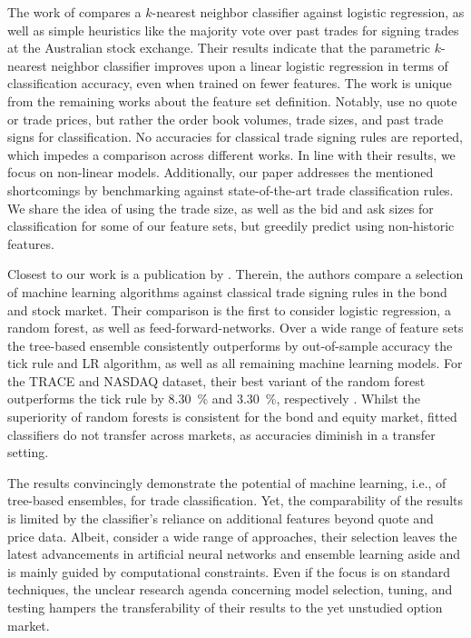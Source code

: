 The work of \textcite[][483]{blazejewskiLocalNonParametricModel2005} compares a $k$-nearest neighbor classifier against logistic regression, as well as simple heuristics like the majority vote over past trades for signing trades at the Australian stock exchange. Their results indicate that the parametric $k$-nearest neighbor classifier improves upon a linear logistic regression in terms of classification accuracy, even when trained on fewer features. The work is unique from the remaining works about the feature set definition. Notably, \textcite[][483]{blazejewskiLocalNonParametricModel2005} use no quote or trade prices, but rather the order book volumes, trade sizes, and past trade signs for classification. No accuracies for classical trade signing rules are reported, which impedes a comparison across different works. In line with their results, we focus on non-linear models. Additionally, our paper addresses the mentioned shortcomings by benchmarking against state-of-the-art trade classification rules. We share the idea of using the trade size, as well as the bid and ask sizes for classification for some of our feature sets, but greedily predict using non-historic features.

Closest to our work is a publication by \textcite[][1--58]{ronenMachineLearningTrade2022}. Therein, the authors compare a selection of machine learning algorithms against classical trade signing rules in the bond and stock market. Their comparison is the first to consider logistic regression, a random forest, as well as \glspl{feed-forward-network}. Over a wide range of feature sets the tree-based ensemble consistently outperforms by out-of-sample accuracy the tick rule and \gls{LR} algorithm, as well as all remaining machine learning models. For the TRACE and \gls{NASDAQ} dataset, their best variant of the random forest outperforms the tick rule by \SI{8.30}{\percent} and \SI{3.30}{\percent}, respectively \autocite[][57]{ronenMachineLearningTrade2022}. Whilst the superiority of random forests is consistent for the bond and equity market, fitted classifiers do not transfer across markets, as accuracies diminish in a transfer setting.

The results convincingly demonstrate the potential of machine learning, i.e., of tree-based ensembles, for trade classification. Yet, the comparability of the results is limited by the classifier's reliance on additional features beyond quote and price data. Albeit, \textcite[][13--14]{ronenMachineLearningTrade2022} consider a wide range of approaches, their selection leaves the latest advancements in artificial neural networks and ensemble learning aside and is mainly guided by computational constraints. Even if the focus is on standard techniques, the unclear research agenda concerning model selection, tuning, and testing hampers the transferability of their results to the yet unstudied option market.

